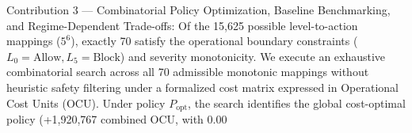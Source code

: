 \documentclass[journal,10pt,onecolumn]{IEEEtran}
\begin{document}
Contribution 3 — Combinatorial Policy Optimization, Baseline Benchmarking, and Regime-Dependent Trade-offs:
Of the 15,625 possible level-to-action mappings ($5^6$), exactly 70 satisfy the operational boundary constraints ($L_0 = \text{Allow}, L_5 = \text{Block}$) and severity monotonicity. We execute an exhaustive combinatorial search across all 70 admissible monotonic mappings without heuristic safety filtering under a formalized cost matrix expressed in Operational Cost Units (OCU). Under policy $P_{\text{opt}}$, the search identifies the global cost-optimal policy (+1,920,767 combined OCU, with 0.00%
\end{document}
